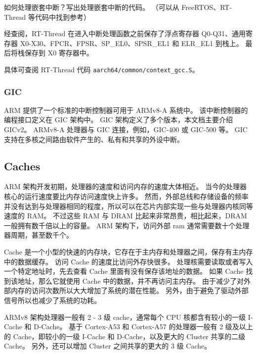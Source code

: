 \begin{probsolu}[title={Problem and Solution \theprob}]{
  如何处理嵌套中断？写出处理嵌套中断的代码。
  （可以从 FreeRTOS、RT-Thread 等代码中找到参考）
  }\label{pb:how-to-hdl-nest-irqs}

  经查阅，RT-Thread 在进入中断处理函数之前保存了浮点寄存器 Q0-Q31、通用寄存器 X0-X30、FPCR、FPSR、SP\_EL0、SPSR\_EL1 和 ELR\_EL1 到栈上。
  最后将栈保存到 X0 寄存器中。

  具体可查阅 RT-Thread 代码 \lstinline!aarch64/common/context_gcc.S!。
\end{probsolu}

\subsubsection{GIC}

ARM 提供了一个标准的中断控制器可用于 ARMv8-A 系统中。
该中断控制器的编程接口定义在 GIC 架构中。
GIC 架构定义了多个版本，本文档主要介绍 GICv2。
ARMv8-A 处理器与 GIC 连接，例如，GIC-400 或 GIC-500 等。
GIC 支持在多核之间路由软件产生的、私有和共享的外设中断。

\subsection{Caches}

ARM 架构开发初期，处理器的速度和访问内存的速度大体相近。
当今的处理器核心的运行速度要比内存访问速度快上许多。
然而，外部总线和存储设备的频率并没有达到与处理器相同的程度，所以可以在芯片内部实现一些与处理器内核同等速度的 RAM。
不过这些 RAM 与 DRAM 比起来非常昂贵，相比起来，DRAM 一般拥有数千倍以上的容量。
ARM 架构下，访问外部 ram 通常需要数十个处理器周期，甚至数千个。

Cache 是一个小型的快速的内存块，它存在于主内存和处理器之间，保存有主内存中的数据缓存。
访问 Cache 的速度比访问外存快很多。
处理核需要读取或者写入一个特定地址时，先去查看 Cache 里面有没有保存该地址的数据。
如果 Cache 找到该地址，那么它就使用 Cache 中的数据，并不再访问主内存。
由于减少了对外部内存的访问次数所以大大增加了系统的潜在性能。
另外，由于避免了驱动外部信号所以也减少了系统的功耗。


ARMv8 架构处理器一般有 2 - 3 级 cache，通常每个 CPU 核都含有较小的一级 I-Cache 和 D-Cache。
基于 Cortex-A53 和 Cortex-A57 的处理器一般有 2 级及以上的 Cache，即较小的一级 I-Cache 和 D-Cache，以及更大的 Cluster 共享的二级 Cache。
另外，还可以增加 Cluster 之间共享的更大的 3 级 Cache。

